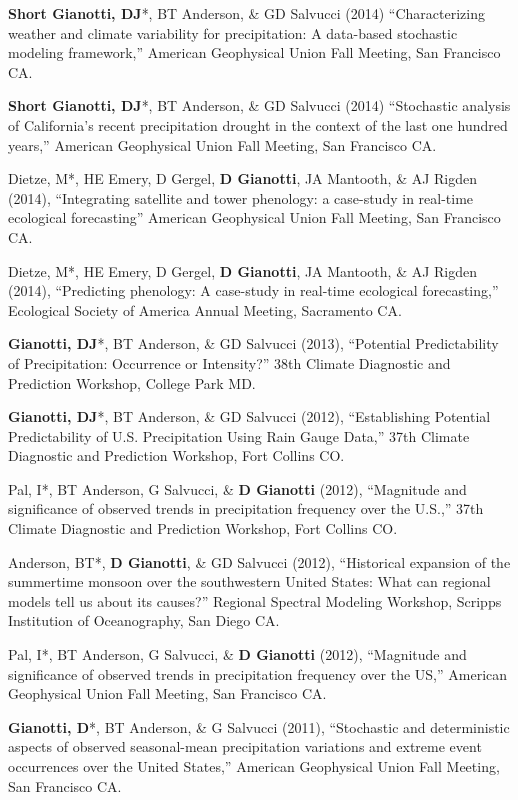 \documentclass[10pt, a4paper]{article}
\newcommand{\lbr}{\vspace*{12pt}}
\newcommand{\years}[1]{\mbox{}\marginnote{\scriptsize #1}} %
\begin{document}
\years{2014}\textbf{Short Gianotti, DJ}*, BT Anderson, \& GD Salvucci (2014) ``Characterizing weather and climate variability for precipitation: A data-based stochastic modeling framework,'' American Geophysical Union Fall Meeting, San Francisco CA.\lbr

\years{2014}\textbf{Short Gianotti, DJ}*, BT Anderson, \& GD Salvucci (2014) ``Stochastic analysis of California's recent precipitation drought in the context of the last one hundred years,'' American Geophysical Union Fall Meeting, San Francisco CA.\lbr

\years{2014}Dietze, M*, HE Emery, D Gergel, \textbf{D Gianotti}, JA Mantooth, \& AJ Rigden (2014), ``Integrating satellite and tower phenology: a case-study in real-time ecological forecasting'' American Geophysical Union Fall Meeting, San Francisco CA.\lbr

\years{2014}Dietze, M*, HE Emery, D Gergel, \textbf{D Gianotti}, JA Mantooth, \& AJ Rigden (2014), ``Predicting phenology: A case-study in real-time ecological forecasting,'' Ecological Society of America Annual Meeting, Sacramento CA.\lbr

\years{2013}\textbf{Gianotti, DJ}*, BT Anderson, \& GD Salvucci  (2013), ``Potential Predictability of Precipitation: Occurrence or Intensity?'' 38th Climate Diagnostic and Prediction Workshop, College Park MD.\lbr

\years{2012}\textbf{Gianotti, DJ}*, BT Anderson, \& GD Salvucci (2012), ``Establishing Potential Predictability of U.S. Precipitation Using Rain Gauge Data,'' 37th Climate Diagnostic and Prediction Workshop, Fort Collins CO.\lbr

\years{2012}Pal, I*, BT Anderson, G Salvucci, \& \textbf{D Gianotti}  (2012), ``Magnitude and significance of observed trends in precipitation frequency over the U.S.,'' 37th Climate Diagnostic and Prediction Workshop, Fort Collins CO.\lbr

\years{2012}Anderson, BT*, \textbf{D Gianotti}, \& GD Salvucci (2012), ``Historical expansion of the summertime monsoon over the southwestern United States: What can regional models tell us about its causes?'' Regional Spectral Modeling Workshop, Scripps Institution of Oceanography, San Diego CA.\lbr

\years{2012}Pal, I*, BT Anderson, G Salvucci, \& \textbf{D Gianotti} (2012), ``Magnitude and significance of observed trends in precipitation frequency over the US,'' American Geophysical Union Fall Meeting, San Francisco CA.\lbr

\years{2011}\textbf{Gianotti, D}*, BT Anderson, \& G Salvucci (2011), ``Stochastic and deterministic aspects of observed seasonal-mean precipitation variations and extreme event occurrences over the United States,'' American Geophysical Union Fall Meeting, San Francisco CA.\lbr
\end{document}
